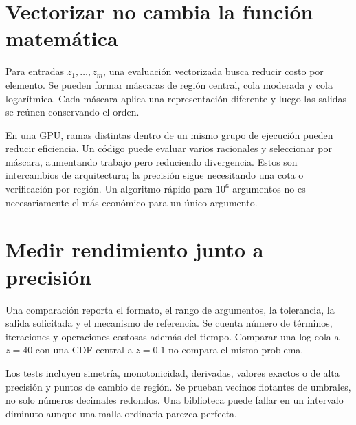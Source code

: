 \documentclass[11pt,a4paper]{article}
\theoremstyle{definition}
\newcounter{problema}
\begin{document}
\section{Vectorizar no cambia la función matemática}
Para entradas $z_1,\ldots,z_m$, una evaluación vectorizada busca reducir costo por elemento.
Se pueden formar máscaras de región central, cola moderada y cola logarítmica.
Cada máscara aplica una representación diferente y luego las salidas se reúnen conservando el orden.

En una GPU, ramas distintas dentro de un mismo grupo de ejecución pueden reducir eficiencia.
Un código puede evaluar varios racionales y seleccionar por máscara, aumentando trabajo pero reduciendo divergencia.
Estos son intercambios de arquitectura; la precisión sigue necesitando una cota o verificación por región.
Un algoritmo rápido para $10^6$ argumentos no es necesariamente el más económico para un único argumento.

\section{Medir rendimiento junto a precisión}
Una comparación reporta el formato, el rango de argumentos, la tolerancia, la salida solicitada y el mecanismo de referencia.
Se cuenta número de términos, iteraciones y operaciones costosas además del tiempo.
Comparar una log-cola a $z=40$ con una CDF central a $z=0.1$ no compara el mismo problema.

Los tests incluyen simetría, monotonicidad, derivadas, valores exactos o de alta precisión y puntos de cambio de región.
Se prueban vecinos flotantes de umbrales, no solo números decimales redondos.
Una biblioteca puede fallar en un intervalo diminuto aunque una malla ordinaria parezca perfecta.
\end{document}
